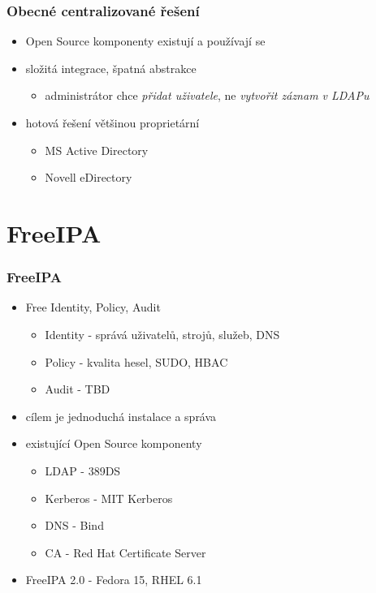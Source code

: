 \documentclass[pdftex,unicode,xcolor=table]{beamer}
\begin{document}
\begin{frame}
    \frametitle{Obecné centralizované řešení}
    \begin{itemize}
        \item Open Source komponenty existují a používají se
        \item složitá integrace, špatná abstrakce
        \begin{itemize}
            \item administrátor chce \textit{přidat uživatele}, ne
            \textit{vytvořit záznam v LDAPu}
        \end{itemize}
        \item hotová řešení většinou proprietární
        \begin{itemize}
            \item MS Active Directory
            \item Novell eDirectory
        \end{itemize}
    \end{itemize}
\end{frame}

\section{FreeIPA}
\begin{frame}
    \frametitle{FreeIPA}
    \begin{itemize}
        \item Free Identity, Policy, Audit
        \begin{itemize}
            \item Identity - správá uživatelů, strojů, služeb, DNS
            \item Policy - kvalita hesel, SUDO, HBAC
            \item Audit - TBD
        \end{itemize}
        \item cílem je jednoduchá instalace a správa
        \item existující Open Source komponenty
        \begin{itemize}
            \item LDAP - 389DS
            \item Kerberos - MIT Kerberos
            \item DNS - Bind
            \item CA - Red Hat Certificate Server
        \end{itemize}
        \item FreeIPA 2.0 - Fedora 15, RHEL 6.1
    \end{itemize}
\end{frame}
\end{document}
